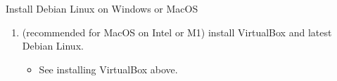 \begin{frame}{Install Debian Linux on Windows or MacOS}
\begin{enumerate}
    \begin{itemize}
      \item See: \textcolor{fh-ooe-red}{\href{https://kb.parallels.com/128445}{https://kb.parallels.com/128445}}.
    \end{itemize}
    \item[Or] (recommended for \textcolor{fh-ooe-red}{MacOS} on Intel or M1) install \textcolor{fh-ooe-red}{VirtualBox} and latest Debian Linux.
    \begin{itemize}
      \item See installing \textcolor{fh-ooe-red}{VirtualBox} above.
    \end{itemize}
  \end{enumerate}
\end{frame}
